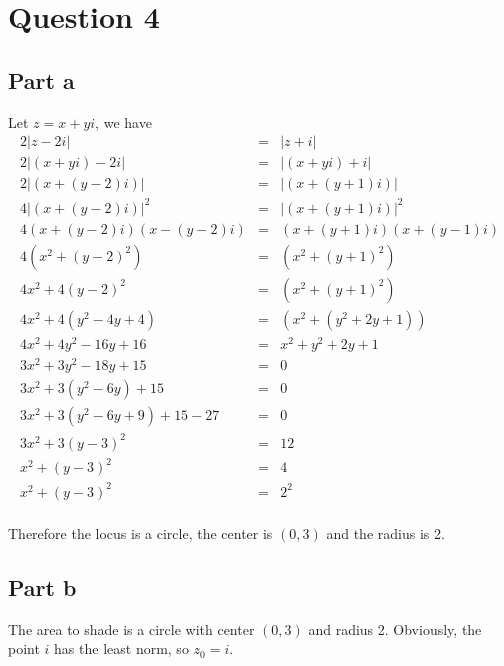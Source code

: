 \section*{Question 4}
\subsection*{Part a}
Let $ z = x + yi $, we have
\begin{eqnarray*}
       2 | z - 2i | &=& | z + i | \\
  2 | (x+yi) - 2i | &=& | (x+yi) + i | \\
  2 | (x + (y-2)i) | &=& | (x + (y + 1) i) | \\
  4 | (x + (y-2)i) |^2 &=& | (x + (y + 1) i) |^2 \\
  4 (x + (y-2)i)(x - (y-2)i) &=& (x + (y + 1)i)(x + (y - 1)i) \\
  4 (x^2 + (y-2)^2) &=& (x^2 + (y + 1)^2) \\
  4x^2 + 4(y-2)^2 &=& (x^2 + (y + 1)^2) \\
  4x^2 + 4(y^2-4y + 4) &=& (x^2 + (y^2 + 2y + 1)) \\
  4x^2 + 4y^2 - 16y + 16 &=& x^2 + y^2 + 2y + 1 \\
  3x^2 + 3y^2 - 18y + 15 &=& 0 \\
  3x^2 + 3(y^2 - 6y) + 15 &=& 0 \\
  3x^2 + 3(y^2 - 6y + 9) + 15 - 27 &=& 0 \\
  3x^2 + 3(y - 3)^2 &=& 12 \\
  x^2 + (y - 3)^2 &=& 4 \\
  x^2 + (y - 3)^2 &=& 2^2 \\
\end{eqnarray*}

Therefore the locus is a circle, the center is $(0, 3) $ and the radius is 2.
\subsection*{Part b}
The area to shade is a circle with center $ (0, 3) $ and radius 2. Obviously, the point $ i $ has the least norm, so $ z_0 = i $.